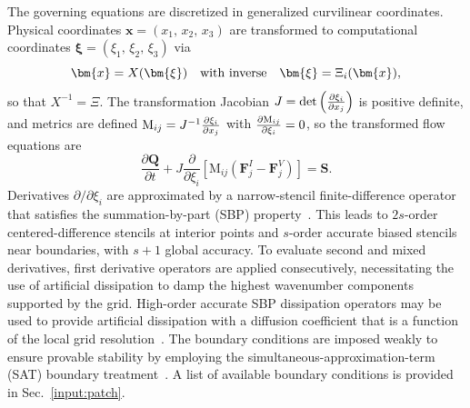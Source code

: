 \documentclass[12pt]{article}
\begin{document}
The governing equations are discretized in generalized curvilinear coordinates. Physical coordinates $\bm{x}=(x_1,\,x_2,\,x_3)$ are transformed to computational coordinates $\bm{\xi}=(\xi_1,\,\xi_2,\,\xi_3)$ via
\begin{equation}
\bm{x}=X(\bm{\xi})\quad{\rm with\ inverse}\quad\bm{\xi}=\Xi_i(\bm{x}),
\end{equation}
so that $X^{-1}=\Xi$. The transformation Jacobian $J={\rm det}\left(\frac{\partial\xi_i}{\partial x_j}\right)$ is positive definite, and metrics are defined ${\rm M}_{ij}=J^{-1}\frac{\partial\xi_i}{\partial x_j}$ with $\frac{\partial {\rm M}_{ij}}{\partial\xi_i}=0$, so the transformed flow equations are 
\begin{equation}\label{eq:curvilinear}
\frac{\partial \bm{Q}}{\partial t}+J \frac{\partial}{\partial \xi_{i}}\left[\mathrm{M}_{i j}\left(\bm{F}_{j}^{I}-\bm{F}_{j}^{V}\right)\right]=\bm{S}.
\end{equation}
Derivatives $\partial/\partial\xi_i$ are approximated by a narrow-stencil finite-difference operator that satisfies the summation-by-part (SBP) property~\cite{strand1994summation}. This leads to $2s$-order centered-difference stencils at interior points and $s$-order accurate biased stencils near boundaries, with $s+1$ global accuracy.  To evaluate second and mixed derivatives, first derivative operators are applied consecutively, necessitating the use of artificial dissipation to damp the highest wavenumber components supported by the grid. High-order accurate SBP dissipation operators may be used to provide artificial dissipation with a diffusion coefficient that is a function of the local grid resolution~\cite{mattsson2004stable,vishnampet2015exact}. The boundary conditions are imposed weakly to ensure provable stability by employing the simultaneous-approximation-term (SAT) boundary treatment~\cite{carpenter1994time, vishnampet2015exact}. A list of available boundary conditions is provided in Sec.~\ref{input:patch}.
\end{document}
